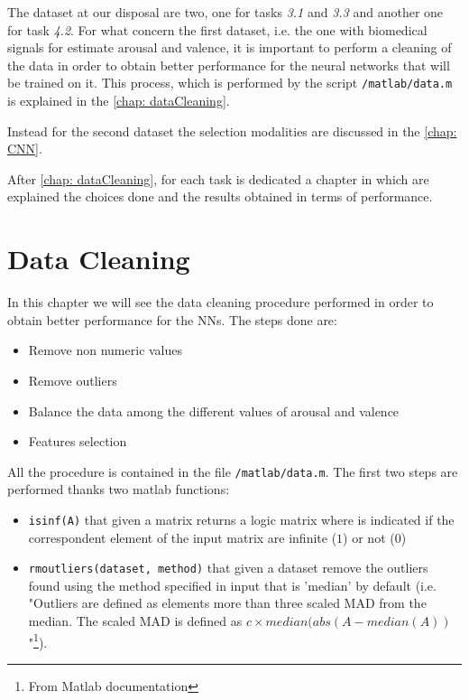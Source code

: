 \documentclass[a4paper]{report}
\begin{document}
	\noindent The dataset at our disposal are two, one for tasks \textit{3.1} and \textit{3.3} and another one for task \textit{4.2}.
	\noindent For what concern the first dataset, i.e. the one with biomedical signals for estimate arousal and valence, it is important to perform a cleaning of the data in order to obtain better performance for the neural networks that will be trained on it. This process, which is performed by the script \texttt{/matlab/data.m} is explained in the \autoref{chap: dataCleaning}. 
	
	\noindent Instead for the second dataset the selection modalities are discussed in the \autoref{chap: CNN}.
	
	\noindent After \autoref{chap: dataCleaning}, for each task is dedicated a chapter in which are explained the choices done and the results obtained in terms of performance.
	
\chapter{Data Cleaning}
	\label{chap: dataCleaning}
	\noindent In this chapter we will see the data cleaning procedure performed in order to obtain better performance for the NNs. The steps done are:
	\begin{itemize}
		\item Remove non numeric values
		\item Remove outliers
		\item Balance the data among the different values of arousal and valence
		\item Features selection
	\end{itemize}
	\noindent All the procedure is contained in the file \texttt{/matlab/data.m}. The first two steps are performed thanks two matlab functions:
	\begin{itemize}
		\item \texttt{isinf(A)} that given a matrix returns a logic matrix where is indicated if the correspondent element of the input matrix are infinite ($1$) or not ($0$) 
		
		\item \texttt{rmoutliers(dataset, method)} that given a dataset remove the outliers found using the method specified in input that is 'median' by default (i.e. "Outliers are defined as elements more than three scaled MAD from the median. The scaled MAD is defined as $c\times median(abs(A-median(A))$"\footnote{From Matlab documentation}).
	\end{itemize} 
	
\end{document}
